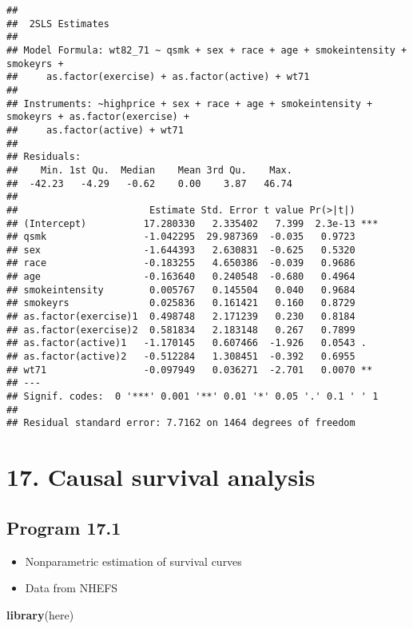 \documentclass[
  10pt,
]{book}
\newenvironment{Shaded}{\begin{snugshade}}{\end{snugshade}}
\newcommand{\KeywordTok}[1]{\textcolor[rgb]{0.13,0.29,0.53}{\textbf{#1}}}
\newcommand{\NormalTok}[1]{#1}
\providecommand{\tightlist}{%
  \setlength{\itemsep}{0pt}\setlength{\parskip}{0pt}}
\begin{document}
\begin{verbatim}
## 
##  2SLS Estimates
## 
## Model Formula: wt82_71 ~ qsmk + sex + race + age + smokeintensity + smokeyrs + 
##     as.factor(exercise) + as.factor(active) + wt71
## 
## Instruments: ~highprice + sex + race + age + smokeintensity + smokeyrs + as.factor(exercise) + 
##     as.factor(active) + wt71
## 
## Residuals:
##    Min. 1st Qu.  Median    Mean 3rd Qu.    Max. 
##  -42.23   -4.29   -0.62    0.00    3.87   46.74 
## 
##                       Estimate Std. Error t value Pr(>|t|)    
## (Intercept)          17.280330   2.335402   7.399  2.3e-13 ***
## qsmk                 -1.042295  29.987369  -0.035   0.9723    
## sex                  -1.644393   2.630831  -0.625   0.5320    
## race                 -0.183255   4.650386  -0.039   0.9686    
## age                  -0.163640   0.240548  -0.680   0.4964    
## smokeintensity        0.005767   0.145504   0.040   0.9684    
## smokeyrs              0.025836   0.161421   0.160   0.8729    
## as.factor(exercise)1  0.498748   2.171239   0.230   0.8184    
## as.factor(exercise)2  0.581834   2.183148   0.267   0.7899    
## as.factor(active)1   -1.170145   0.607466  -1.926   0.0543 .  
## as.factor(active)2   -0.512284   1.308451  -0.392   0.6955    
## wt71                 -0.097949   0.036271  -2.701   0.0070 ** 
## ---
## Signif. codes:  0 '***' 0.001 '**' 0.01 '*' 0.05 '.' 0.1 ' ' 1
## 
## Residual standard error: 7.7162 on 1464 degrees of freedom
\end{verbatim}

\hypertarget{causal-survival-analysis}{%
\chapter*{17. Causal survival analysis}\label{causal-survival-analysis}}

\hypertarget{program-17.1}{%
\section{Program 17.1}\label{program-17.1}}

\begin{itemize}
\tightlist
\item
  Nonparametric estimation of survival curves
\item
  Data from NHEFS
\end{itemize}

\begin{Shaded}
\begin{Highlighting}[]
\KeywordTok{library}\NormalTok{(here)}
\end{Highlighting}
\end{Shaded}
\end{document}
